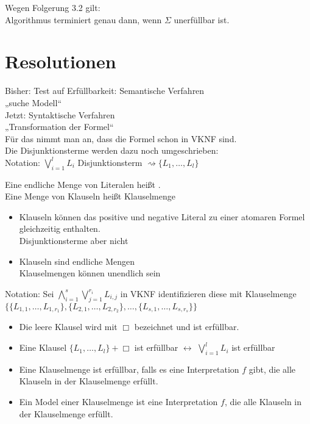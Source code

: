 Wegen Folgerung 3.2 gilt:\\
Algorithmus terminiert genau dann, wenn $\Sigma$ unerfüllbar ist.

\newpage

\section{Resolutionen}

Bisher: Test auf Erfüllbarkeit: Semantische Verfahren\\
„suche Modell“\\

Jetzt: Syntaktische Verfahren\\
„Transformation der Formel“\\

Für das  nimmt man an, dass die Formel schon in VKNF sind.\\ Die Disjunktionsterme werden dazu noch umgeschrieben:\\

Notation: $\bigvee_{i=1}^l L_i$ Disjunktionsterm $\rightsquigarrow \{ L_1, …, L_l \}$

Eine endliche Menge von Literalen heißt .\\
Eine Menge von Klauseln heißt Klauselmenge

\bemerkung{}
\begin{itemize}
\item Klauseln können das positive und negative Literal zu einer atomaren Formel gleichzeitig enthalten.\\
Disjunktionsterme aber nicht

\item Klauseln sind endliche Mengen\\
Klauselmengen können unendlich sein
\end{itemize}

Notation: Sei $\bigwedge_{i=1}^s \bigvee_{j=1}^{r_i} L_{i,j}$ in VKNF identifizieren diese mit Klauselmenge\\
$\{ \{ L_{1,1}, …, L_{1, r_1} \}, \{ L_{2,1}, …, L_{2, r_2}\}, …, \{ L_{s,1}, …, L_{s, r_s} \} \}$

\begin{itemize}
\item Die leere Klausel wird mit $\Box$ bezeichnet und ist erfüllbar.

\item Eine Klausel $\{ L_1, …, L_l \} + \Box$ ist erfüllbar $\leftrightarrow$ $\bigvee_{i=1}^l L_i$ ist erfüllbar

\item Eine Klauselmenge ist erfüllbar, falls es eine Interpretation $f$ gibt, die alle Klauseln in der Klauselmenge erfüllt.

\item Ein Model einer Klauselmenge ist eine Interpretation $f$, die alle Klauseln in der Klauselmenge erfüllt.
\end{itemize}

